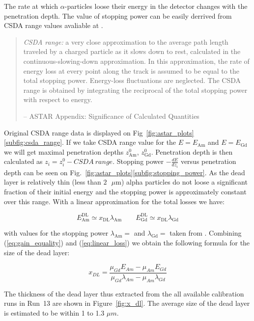 \documentclass[a4paper,12pt]{article}
\begin{document}
The rate at which $\alpha$-particles loose their energy in the
detector changes with the penetration depth. The value of stopping power can
be easily derrived from CSDA range values avaliable at \cite{astar_database}.
\begin{quote}
\emph{CSDA range:} a very close approximation to the average path length
traveled by a charged particle as it slows down to rest, calculated in the
continuous-slowing-down approximation. In this approximation, the rate of
energy loss at every point along the track is assumed to be equal to the
total stopping power. Energy-loss fluctuations are neglected. The CSDA
range is obtained by integrating the reciprocal of the total stopping
power with respect to energy.

-- ASTAR Appendix: Significance of Calculated Quantities
\end{quote}
Original CSDA range data is displayed on Fig~\ref{fig:astar_plots}\ref{subfig:csda_range}.
If we take CSDA range value for the $E=E_{\text{Am}}$ and $E=E_{\text{Gd}}$
we will get maximal penetration depths $z^0_{\text{Am}}$, $z^0_{\text{Gd}}$.
Penetration depth is then calculated as $z_i = z^0_i - CSDA\:range$.
Stopping power $-\frac{dE}{dz_i}$ versus penetration depth can be seen
on Fig.~\ref{fig:astar_plots}\ref{subfig:stopping_power}.
As the dead layer is relatively thin (less than $2\text{ }\mu\text{m}$) alpha particles do not loose a
significant fraction of their initial energy and the stopping power
is approximately constant over this range. With a linear approximation for
the total losses we have:

\begin{equation}
E^\text{DL}_\text{Am} \simeq x_\text{DL} \lambda_\text{Am} \qquad
E^\text{DL}_\text{Gd} \simeq x_\text{DL} \lambda_\text{Gd}
\label{eq:linear_loss}
\end{equation}

\noindent
with values for the stopping power $\lambda_\text{Am} = $ and $\lambda_\text{Gd}
= $ taken from \cite{astar_database}. Combining (\ref{eq:gain_equality}) and
(\ref{eq:linear_loss}) we obtain the following formula for the size of the dead
layer:

\begin{equation}
x_{DL} = \frac{\mu_{Gd} E_{Am} - \mu_{Am} E_{Gd}}{\mu_{Gd}\lambda_{Am} - \mu_{Am}\lambda_{Gd}}
\label{eq:x_dl}
\end{equation}

The thickness of the dead layer thus extracted from the all available
calibration runs in Run~13 are shown in Figure~\ref{fig:x_dl}. The average size
of the dead layer is estimated to be within 1 to 1.3 $\mu m$.
\end{document}
